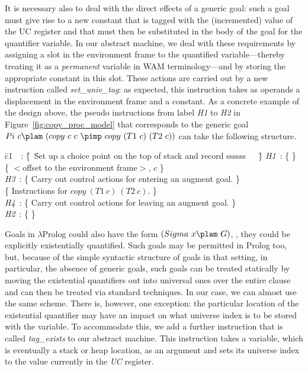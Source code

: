 It is necessary also to deal with the direct effects of a generic
goal: such a goal must give rise to a new constant that is tagged with
the (incremented) value of the UC register and that must then be
substituted in the body of the goal for the quantifier variable. In
our abstract machine, we deal with these requirements by assigning a
slot in the environment frame to the quantified variable---thereby
treating it as a {\em permanent} variable in WAM terminology---and by
storing the appropriate constant in this slot. These actions are
carried out by a new instruction called {\it set\_univ\_tag}: as
expected, this instruction takes as operands a displacement in the
environment frame and a constant.
As a concrete example of the design above, the pseudo instructions
from label {\it H1} to {\it H2} in Figure~\ref{fig:copy_proc_model} that
corresponds to the generic goal
$Pi\ c\plam \ (copy\ c\ c\ \pimp \ copy\ (T1\ c)\ (T2\ c))$
can take the following structure.
\begin{tabbing}
\quad\= c1\ \ : \=\{\ \=Set up a choice point on the top of stack and record ssssss\ \ \ \=\}\kill
\> {\it H1}\ :  \>\{                                                                           \>\} \\
\>              \>\{  $<$offset to the environment frame$>$, $c$                               \>\} \\
\> {\it H3}\ :  \>\{ \>Carry out control actions for entering an augment goal.                                       \>\} \\
\>              \>\{ \>Instructions for $copy\ (T1\ c)\ (T2\ c)$.                                                    \>\} \\
\> {\it H4}\ :  \>\{ \>Carry out control actions for leaving an augment goal.                                        \>\} \\
\> {\it H2}\ :  \>\{                                                                           \>\}
\end{tabbing}

Goals in $\lambda$Prolog could also have the form
$(Sigma\ x\plam\ G)$, \ie, they could be explicitly existentially
quantified. Such goals may be permitted in Prolog too, but, because of
the simple syntactic structure of goals in that setting, in
particular, the absence of generic goals, such goals can be treated
statically by moving the existential quantifiers out into universal
ones over the entire clause and can then be treated via standard
techniques. In our case, we can almost use the same scheme. There is,
however, one exception: the particular location of the existential
quantifier may have an impact on what universe index is to be
stored with the variable. To accommodate this, we add a further
instruction that is called {\em tag\_exists} to our abstract
machine. This instruction takes a variable, which is eventually a stack
or heap location, as an argument and sets its universe index to the
value currently in the {\em UC} register.

